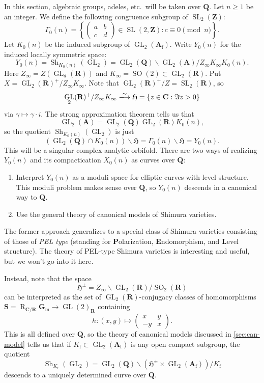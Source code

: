 \documentclass{article}
\DeclareMathOperator{\GL}{GL}
\DeclareMathOperator{\restrict}{R}
\DeclareMathOperator{\shimura}{Sh}
\DeclareMathOperator{\SL}{SL}
\DeclareMathOperator{\SO}{SO}
\newcommand{\dA}{\mathbf{A}}
\newcommand{\dC}{\mathbf{C}}
\newcommand{\dG}{\mathbf{G}}
\newcommand{\dR}{\mathbf{R}}
\newcommand{\dQ}{\mathbf{Q}}
\newcommand{\dS}{\mathbf{S}}
\newcommand{\dZ}{\mathbf{Z}}
\newcommand{\fH}{\mathfrak{H}}
\newcommand{\finite}{\mathrm{f}}
\newcommand{\iso}{\xlongrightarrow\sim}
\newcommand{\mult}{\mathrm{m}}
\begin{document}
In this section, algebraic groups, adeles, etc.~will be taken over $\dQ$. 
Let $n\geqslant 1$ be an integer. We define the following congruence subgroup 
of $\SL_2(\dZ)$:
\[
  \Gamma_0(n) = \left\{\begin{pmatrix}a & b \\ c & d \end{pmatrix}\in \SL(2,\dZ) : c\equiv 0\pmod n\right\} .
\]
Let $K_0(n)$ be the induced subgroup of $\GL_2(\dA_\finite)$. Write $Y_0(n)$ 
for the induced locally symmetric space: 
\[
  Y_0(n) = \shimura_{K_0(n)}(\GL_2) = \GL_2(\dQ)\backslash \GL_2(\dA) / Z_\infty K_\infty K_0(n) .
\]
Here $Z_\infty=Z(\GL_d(\dR))$ and $K_\infty=\SO(2)\subset \GL_2(\dR)$. Put 
$X=\GL_2(\dR)^+/Z_\infty K_\infty$. Note that $\GL_2(\dR)^+/Z = \SL_2(\dR)$, so 
\[
  \GL_2(\dR)^+ / Z_\infty K_\infty \iso \fH = \{z\in \dC:\Im z>0\} 
\]
via $\gamma\mapsto \gamma\cdot i$. The strong approximation theorem tells us 
that 
\[
  \GL_2(\dA) = \GL_2(\dQ) \GL_2(\dR) K_0(n),
\]
so the quotient $\shimura_{K_0(n)}(\GL_2)$ is just 
\[
  (\GL_2(\dQ)\cap K_0(n))\backslash \fH = \Gamma_0(n) \backslash \fH = Y_0(n).
\]
This will be a singular complex-analytic orbifold. There are two ways of 
realizing $Y_0(n)$ and its compactication $X_0(n)$ as curves over $\dQ$: 
\begin{enumerate}
  \item Interpret $Y_0(n)$ as a moduli space for elliptic curves with level 
    structure. This moduli problem makes sense over $\dQ$, so $Y_0(n)$ descends 
    in a canonical way to $\dQ$. 
  \item Use the general theory of canonical models of Shimura varieties. 
\end{enumerate}
The former approach generalizes to a special class of Shimura varieties 
consisting of those of \emph{PEL type} (standing for 
\textbf{P}olarization, \textbf{E}ndomorphism, and \textbf{L}evel structure). 
The theory of PEL-type Shimura varieties is interesting and useful, but we 
won't go into it here. 

Instead, note that the space 
\[
  \fH^\pm = Z_\infty \backslash \GL_2(\dR) / \SO_2(\dR) 
\]
can be interpreted as the set of $\GL_2(\dR)$-conjugacy classes of 
homomorphisms $\dS=\restrict_{\dC/\dR}\dG_\mult\to \GL(2)_\dR$ containing 
\[
  h:(x,y)\mapsto \begin{pmatrix} x & y \\ -y & x \end{pmatrix} .
\]
This is all defined over $\dQ$, so the theory of canonical models discussed 
in \autoref{sec:can-model} tells us that if 
$K_\finite\subset\GL_2(\dA_\finite)$ is any open compact subgroup, the quotient 
\[
  \shimura_{K_\finite}(\GL_2) = \GL_2(\dQ)\backslash (\fH^\pm\times \GL_2(\dA_\finite))/K_\finite
\]
descends to a uniquely determined curve over $\dQ$. 
\end{document}
